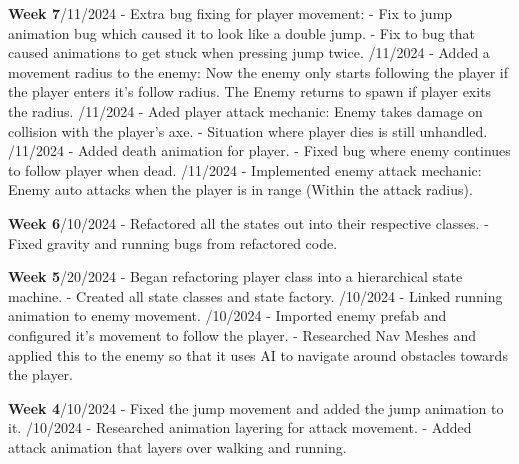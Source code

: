 \documentclass[]{final_report}
\begin{document}
\textbf{Week 7}/11/2024
\newline- Extra bug fixing for player movement:
\newline- Fix to jump animation bug which caused it to look like a double jump.
\newline- Fix to bug that caused animations to get stuck when pressing jump twice.
/11/2024
\newline- Added a movement radius to the enemy: Now the enemy only starts following the player if the player enters it's follow radius. The Enemy returns to spawn if player exits the radius.
/11/2024
\newline- Aded player attack mechanic: Enemy takes damage on collision with the player's axe.
\newline- Situation where player dies is still unhandled.
/11/2024
\newline- Added death animation for player.
\newline- Fixed bug where enemy continues to follow player when dead.
/11/2024
\newline- Implemented enemy attack mechanic: Enemy auto attacks when the player is in range (Within the attack radius).

\textbf{Week 6}/10/2024
\newline- Refactored all the states out into their respective classes.
\newline- Fixed gravity and running bugs from refactored code.

\textbf{Week 5}/20/2024
\newline- Began refactoring player class into a hierarchical state machine.
\newline- Created all state classes and state factory.
/10/2024
\newline- Linked running animation to enemy movement.
/10/2024
\newline- Imported enemy prefab and configured it's movement to follow the player.
\newline- Researched Nav Meshes and applied this to the enemy so that it uses AI to navigate around obstacles towards the player.

\textbf{Week 4}/10/2024
\newline- Fixed the jump movement and added the jump animation to it.
/10/2024
\newline- Researched animation layering for attack movement.
\newline- Added attack animation that layers over walking and running.
\end{document}
